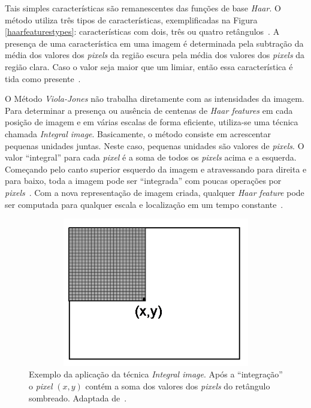 Tais simples características são remanescentes das funções de base \textit{Haar}. O método utiliza três tipos de características, exemplificadas na Figura \ref{haarfeaturestypes}: características com dois, três ou quatro retângulos~\cite{violajones}. A presença de uma característica em uma imagem é determinada pela subtração da média dos valores dos \textit{pixels} da região escura pela média dos valores dos \textit{pixels} da região clara. Caso o valor seja maior que um limiar, então essa característica é tida como presente~\cite{servodetection}.

O Método \textit{Viola-Jones} não trabalha diretamente com as intensidades da imagem. Para determinar a presença ou ausência de centenas de \textit{Haar features} em cada posição de imagem e em várias escalas de forma eficiente, utiliza-se uma técnica chamada \textit{Integral image}. Basicamente, o método consiste em acrescentar pequenas unidades juntas. Neste caso, pequenas unidades são valores de \textit{pixels}. O valor ``integral'' para cada \textit{pixel} é a soma de todos os \textit{pixels} acima e a esquerda. Começando pelo canto superior esquerdo da imagem e atravessando para direita e para baixo, toda a imagem pode ser ``integrada'' com poucas operações por \textit{pixels}~\cite{servodetection, violajones}. Com a nova representação de imagem criada, qualquer \textit{Haar feature} pode ser computada para qualquer escala e localização em um tempo constante~\cite{violajones}.

	\begin{figure}[hbt]
		\begin{center}
			\includegraphics[height=6.5cm,width=12.5cm]{figuras/2.FundamentacaoTeorica/integral_image.png}
		\end{center}
		\caption{Exemplo da aplicação da técnica \textit{Integral image}. Após a ``integração'' o \textit{pixel} $\displaystyle (x,y)$ contém a soma dos valores dos \textit{pixels} do retângulo sombreado. Adaptada de~\cite{servodetection}.}
		\label{integralimage}
	\end{figure}

